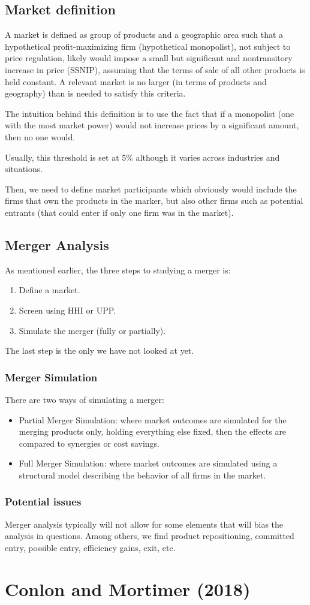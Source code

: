 \subsection{Market definition}

A market is defined as group of products and a geographic area such that a hypothetical profit-maximizing firm (hypothetical monopolist), not subject to price regulation, likely would impose a small but significant and nontransitory increase in price (SSNIP), assuming that the terms of sale of all other products is held constant. A relevant market is no larger (in terms of products and geography) than is needed to satisfy this criteria.

The intuition behind this definition is to use the fact that if a monopolist (one with the most market power) would not increase prices by a significant amount, then no one would.

Usually, this threshold is set at 5\% although it varies across industries and situations.

Then, we need to define market participants which obviously would include the firms that own the products in the marker, but also other firms such as potential entrants (that could enter if only one firm was in the market).

\subsection{Merger Analysis}

As mentioned earlier, the three steps to studying a merger is:\begin{enumerate}
\item Define a market.
\item Screen using HHI or UPP.
\item Simulate the merger (fully or partially).
\end{enumerate}

The last step is the only we have not looked at yet.

\subsubsection{Merger Simulation}

There are two ways of simulating a merger:\begin{itemize}
\item Partial Merger Simulation: where market outcomes are simulated for the merging products only, holding everything else fixed, then the effects are compared to synergies or cost savings.
\item Full Merger Simulation: where market outcomes are simulated using a structural model describing the behavior of all firms in the market.
\end{itemize}

\subsubsection{Potential issues}

Merger analysis typically will not allow for some elements that will bias the analysis in questions. Among others, we find product repositioning, committed entry, possible entry, efficiency gains, exit, etc.

\section{Conlon and Mortimer (2018)}

